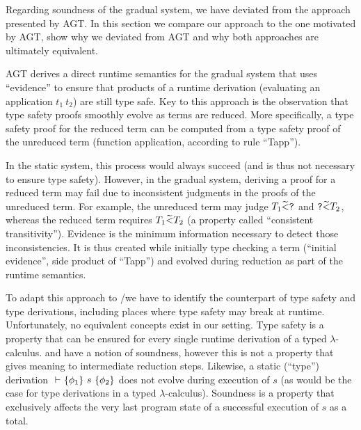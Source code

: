 Regarding soundness of the gradual system, we have deviated from the approach presented by AGT.
In this section we compare our approach to the one motivated by AGT, show why we deviated from AGT and why both approaches are ultimately equivalent.

AGT derives a direct runtime semantics for the gradual system that uses “evidence” to ensure that products of a runtime derivation (evaluating an application $t_1~t_2$) are still type safe.
Key to this approach is the observation that type safety proofs smoothly evolve as terms are reduced.
More specifically, a type safety proof for the reduced term can be computed from a type safety proof of the unreduced term (function application, according to rule “Tapp”).

In the static system, this process would always succeed (and is thus not necessary to ensure type safety).
However, in the gradual system, deriving a proof for a reduced term may fail due to inconsistent judgments in the proofs of the unreduced term.
For example, the unreduced term may judge $T_1 \widetilde{<} \textup{\texttt{?}}$ and $\textup{\texttt{?}} \widetilde{<} T_2$, whereas the reduced term requires $T_1 \widetilde{<} T_2$ (a property called “consistent transitivity”).
Evidence is the minimum information necessary to detect those inconsistencies.
It is thus created while initially type checking a term (“initial evidence”, side product of “\gradT Tapp”) and evolved during reduction as part of the runtime semantics.


\begin{comment}{Combining Proofs}~\\
    Given proofs for type judgments $\Gamma \vdash t_1 : T_1$ and $\Gamma \vdash t_2 : T_2$, one may derive a proof for $\Gamma \vdash t_1~t_2 : \predicate{cod}(T_1)$.
    
    In the static system, this proof must exist since $\Gamma \vdash t_1~t_2 : \predicate{cod}(T_1)$ would have been proven before 
\end{comment}

To adapt this approach to \svl/\gvl we have to identify the counterpart of type safety and type derivations, including places where type safety may break at runtime.
Unfortunately, no equivalent concepts exist in our setting.
Type safety is a property that can be ensured for every single runtime derivation of a typed $\lambda$-calculus.
\svl and \gvl have a notion of soundness, however this is not a property that gives meaning to intermediate reduction steps.
Likewise, a static (“type”) derivation ${} \,\,{\vdash}\,\, \{{\phi_1}\} ~{s}~ \{{\phi_2}\}$ does not evolve during execution of $s$ (as would be the case for type derivations in a typed $\lambda$-calculus).
Soundness is a property that exclusively affects the very last program state of a successful execution of $s$ as a total.


